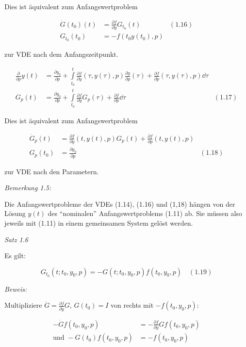 Dies ist äquivalent zum Anfangswertproblem

\begin{align*}
\dot G(t_0) (t) &= \frac{\partial f}{\partial y} G_{t_0} (t) & (1.16) \\
G_{t_0} (t_0) &= -f(t_0 y(t_0), p) 
\end{align*}

zur VDE nach dem Anfangszeitpunkt.


\begin{align*}
\frac \partial{\partial p} y(t) &= \frac{\partial y_0}{\partial p} + \int\limits_{t_0}^t \frac{\partial f}{\partial y} (\tau, y(\tau), p) \frac{\partial y}{\partial p} (\tau) + \frac{\partial f}{\partial p} (\tau, y(\tau), p) \dd \tau \\
G_p(t) &= \frac{\partial y_0}{\partial p} + \int\limits_{t_0}^t \frac{\partial f}{\partial y} G_p(\tau) + \frac{\partial f}{\partial p} \dd \tau & (1.17)
\end{align*}

Dies ist äquivalent zum Anfangswertproblem

\begin{align*}
\dot G_p(t) &= \frac{\partial f}{\partial y} (t,y(t),p) G_p(t) + \frac{\partial f}{\partial p} (t, y(t), p) \\
G_p(t_0) &= \frac{\partial y_0}{\partial p} & (1.18)
\end{align*}

zur VDE nach den Parametern.

\emph{Bemerkung 1.5:}

Die Anfangswertprobleme der VDEs (1.14), (1.16) und (1,18) hängen von der Lösung $y(t)$ des "`nominalen"' Anfangswertproblems (1.11) ab. Sie müssen also jeweils mit (1.11) in einem gemeinsamen System gelöst werden.

\emph{Satz 1.6}

Es gilt:

\[ G_{t_0} (t; t_0, y_0, p) = -G(t; t_0, y_0, p) f(t_0, y_0, p) \quad (1.19) \]

\emph{Beweis:}

Multipliziere $\dot G = \tfrac{\partial f}{\partial y} G$, $G(t_0) = I$ von rechts mit $-f(t_0, y_0, p):$

\begin{align*}
-\dot G f(t_0,y_0,p) &= -\frac{\partial f}{\partial y} G f(t_0, y_0, p) \\
\text{und } -G(t_0) f(t_0, y_0, p) &= -f(t_0, y_0, p)
\end{align*}

